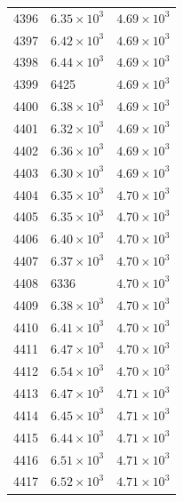 \begin{table}[H]
\begin{tabular}{lll}
4396 & $\displaystyle 6.35 \times 10^{3}$ & $\displaystyle 4.69 \times 10^{3}$ \\
4397 & $\displaystyle 6.42 \times 10^{3}$ & $\displaystyle 4.69 \times 10^{3}$ \\
4398 & $\displaystyle 6.44 \times 10^{3}$ & $\displaystyle 4.69 \times 10^{3}$ \\
4399 & 6425 & $\displaystyle 4.69 \times 10^{3}$ \\
4400 & $\displaystyle 6.38 \times 10^{3}$ & $\displaystyle 4.69 \times 10^{3}$ \\
4401 & $\displaystyle 6.32 \times 10^{3}$ & $\displaystyle 4.69 \times 10^{3}$ \\
4402 & $\displaystyle 6.36 \times 10^{3}$ & $\displaystyle 4.69 \times 10^{3}$ \\
4403 & $\displaystyle 6.30 \times 10^{3}$ & $\displaystyle 4.69 \times 10^{3}$ \\
4404 & $\displaystyle 6.35 \times 10^{3}$ & $\displaystyle 4.70 \times 10^{3}$ \\
4405 & $\displaystyle 6.35 \times 10^{3}$ & $\displaystyle 4.70 \times 10^{3}$ \\
4406 & $\displaystyle 6.40 \times 10^{3}$ & $\displaystyle 4.70 \times 10^{3}$ \\
4407 & $\displaystyle 6.37 \times 10^{3}$ & $\displaystyle 4.70 \times 10^{3}$ \\
4408 & 6336 & $\displaystyle 4.70 \times 10^{3}$ \\
4409 & $\displaystyle 6.38 \times 10^{3}$ & $\displaystyle 4.70 \times 10^{3}$ \\
4410 & $\displaystyle 6.41 \times 10^{3}$ & $\displaystyle 4.70 \times 10^{3}$ \\
4411 & $\displaystyle 6.47 \times 10^{3}$ & $\displaystyle 4.70 \times 10^{3}$ \\
4412 & $\displaystyle 6.54 \times 10^{3}$ & $\displaystyle 4.70 \times 10^{3}$ \\
4413 & $\displaystyle 6.47 \times 10^{3}$ & $\displaystyle 4.71 \times 10^{3}$ \\
4414 & $\displaystyle 6.45 \times 10^{3}$ & $\displaystyle 4.71 \times 10^{3}$ \\
4415 & $\displaystyle 6.44 \times 10^{3}$ & $\displaystyle 4.71 \times 10^{3}$ \\
4416 & $\displaystyle 6.51 \times 10^{3}$ & $\displaystyle 4.71 \times 10^{3}$ \\
4417 & $\displaystyle 6.52 \times 10^{3}$ & $\displaystyle 4.71 \times 10^{3}$ \\

\end{tabular}
\end{table}
